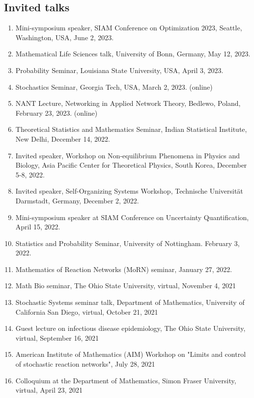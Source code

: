 \documentclass[11pt,a4paper,sans]{moderncv}        %
\begin{document}
\subsection{Invited talks}
\begin{enumerate}
	\item Mini-symposium speaker, SIAM Conference on Optimization 2023, Seattle, Washington, USA, June 2, 2023. 
	\item Mathematical Life Sciences talk, University of Bonn, Germany, May 12, 2023. 
	\item Probability Seminar, Louisiana State University, USA, April 3, 2023. 
	\item Stochastics Seminar, Georgia Tech, USA, March 2, 2023. (online)
	\item NANT Lecture, Networking in Applied Network Theory, Bedlewo, Poland, February 23, 2023. (online)
	\item Theoretical Statistics and Mathematics Seminar, Indian Statistical Institute, New Delhi, December 14, 2022. 
	\item Invited speaker, Workshop on Non-equilibrium Phenomena in Physics and Biology, Asia Pacific Center for Theoretical Physics, South Korea, December 5-8, 2022.  
	\item Invited speaker, Self-Organizing Systems Workshop, Technische Universit\"at Darmstadt, Germany,  December 2, 2022. 
	\item Mini-symposium speaker at SIAM Conference on Uncertainty Quantification, April 15, 2022. 
	\item Statistics and Probability Seminar, University of Nottingham. February 3, 2022. 
	\item Mathematics of Reaction Networks (MoRN) seminar, January 27, 2022. 
	\item Math Bio seminar, The Ohio State University, virtual, November 4, 2021
	\item Stochastic Systems seminar talk, Department of Mathematics, University of California San Diego, virtual, October 21, 2021
	\item Guest lecture on infectious disease epidemiology, The Ohio State University, virtual, September 16, 2021
	\item American Institute of Mathematics (AIM) Workshop on "Limits and control of stochastic reaction networks", July 28, 2021
	\item Colloquium at the Department of Mathematics, Simon Fraser University, virtual, April 23, 2021

\end{enumerate}
\end{document}
